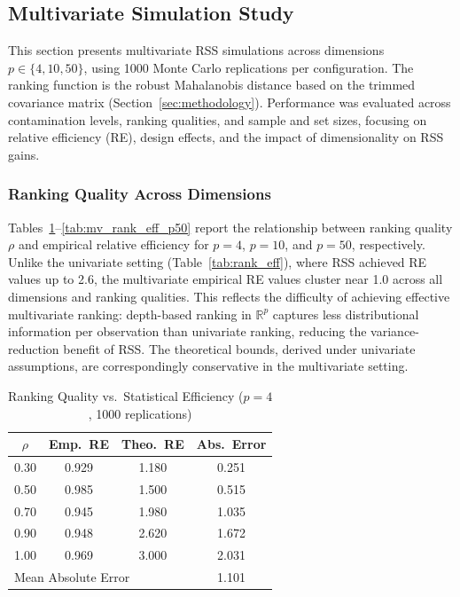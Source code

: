 \documentclass[12pt]{article}
\begin{document}
\subsection{Multivariate Simulation Study}
\label{subsec:multivariate_simulation}

This section presents multivariate RSS simulations across dimensions $p \in \{4, 10, 50\}$, using 1000 Monte Carlo replications per configuration. The ranking function is the robust Mahalanobis distance based on the trimmed covariance matrix (Section~\ref{sec:methodology}). Performance was evaluated across contamination levels, ranking qualities, and sample and set sizes, focusing on relative efficiency (RE), design effects, and the impact of dimensionality on RSS gains.

\subsubsection{Ranking Quality Across Dimensions}

Tables~\ref{tab:mv_rank_eff_p4}--\ref{tab:mv_rank_eff_p50} report the relationship between ranking quality $\rho$ and empirical relative efficiency for $p = 4$, $p = 10$, and $p = 50$, respectively. Unlike the univariate setting (Table~\ref{tab:rank_eff}), where RSS achieved RE values up to 2.6, the multivariate empirical RE values cluster near 1.0 across all dimensions and ranking qualities. This reflects the difficulty of achieving effective multivariate ranking: depth-based ranking in $\mathbb{R}^p$ captures less distributional information per observation than univariate ranking, reducing the variance-reduction benefit of RSS. The theoretical bounds, derived under univariate assumptions, are correspondingly conservative in the multivariate setting.

\begin{table}[htbp]
\centering
\caption{Ranking Quality vs.\ Statistical Efficiency ($p = 4$, 1000 replications)}
\label{tab:mv_rank_eff_p4}
\begin{tabular}{cccc}
\toprule
$\rho$ & Emp.\ RE & Theo.\ RE & Abs.\ Error \\
\midrule
0.30 & 0.929 & 1.180 & 0.251 \\
0.50 & 0.985 & 1.500 & 0.515 \\
0.70 & 0.945 & 1.980 & 1.035 \\
0.90 & 0.948 & 2.620 & 1.672 \\
1.00 & 0.969 & 3.000 & 2.031 \\
\midrule
\multicolumn{3}{l}{Mean Absolute Error} & 1.101 \\
\bottomrule
\end{tabular}
\end{table}
\end{document}

